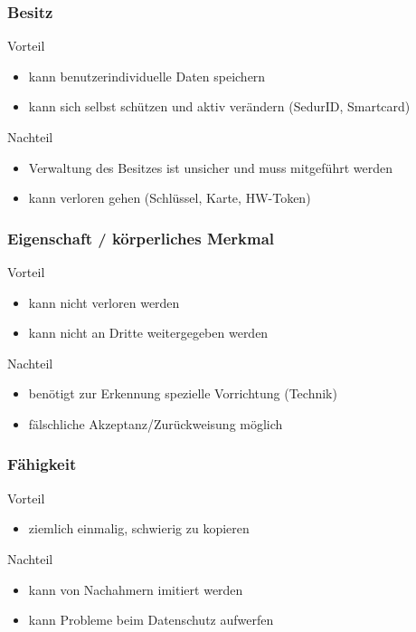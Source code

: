 \documentclass[10pt,a4paper]{article}
\begin{document}
\subsubsection*{Besitz}
Vorteil
\begin{itemize}[noitemsep,topsep=0pt,leftmargin=*]
    \item kann benutzerindividuelle Daten speichern
    \item kann sich selbst schützen und aktiv verändern (SedurID, Smartcard)
\end{itemize}
Nachteil
\begin{itemize}[noitemsep,topsep=0pt,leftmargin=*]
    \item Verwaltung des Besitzes ist unsicher und muss mitgeführt werden
    \item kann verloren gehen (Schlüssel, Karte, HW-Token)
\end{itemize}

\subsubsection*{Eigenschaft / körperliches Merkmal}
Vorteil
\begin{itemize}[noitemsep,topsep=0pt,leftmargin=*]
    \item kann nicht verloren werden
    \item kann nicht an Dritte weitergegeben werden
\end{itemize}
Nachteil
\begin{itemize}[noitemsep,topsep=0pt,leftmargin=*]
    \item benötigt zur Erkennung spezielle Vorrichtung (Technik)
    \item fälschliche Akzeptanz/Zurückweisung möglich
\end{itemize}

\subsubsection*{Fähigkeit}
Vorteil
\begin{itemize}[noitemsep,topsep=0pt,leftmargin=*]
    \item ziemlich einmalig, schwierig zu kopieren
\end{itemize}
Nachteil
\begin{itemize}[noitemsep,topsep=0pt,leftmargin=*]
    \item kann von Nachahmern imitiert werden
    \item kann Probleme beim Datenschutz aufwerfen
\end{itemize}
\end{document}
